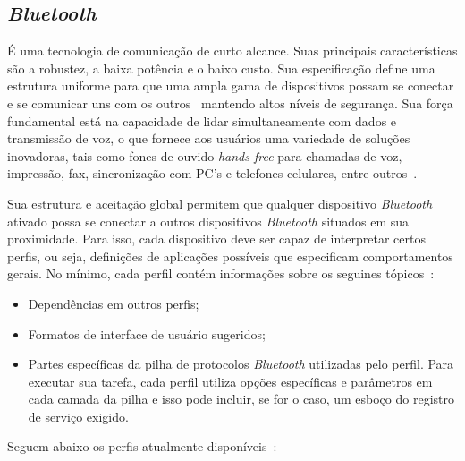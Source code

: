 \subsection{\emph{Bluetooth}}
\label{subsec:bluetooth}

É uma tecnologia de comunicação de curto alcance. Suas principais características são a robustez, a baixa potência e o baixo custo. Sua especificação define uma estrutura uniforme para que uma ampla gama de dispositivos possam se conectar e se comunicar uns com os outros~\cite{bluetoothoverview} mantendo altos níveis de segurança. Sua força fundamental está na capacidade de lidar simultaneamente com dados e transmissão de voz, o que fornece aos usuários uma variedade de soluções inovadoras, tais como fones de ouvido \emph{hands-free} para chamadas de voz, impressão, fax, sincronização com PC's e telefones celulares, entre outros~\cite{bluetoothoverview}.

Sua estrutura e aceitação global permitem que qualquer dispositivo \emph{Bluetooth} ativado possa se conectar a outros dispositivos \emph{Bluetooth} situados em sua proximidade. Para isso, cada dispositivo deve ser capaz de interpretar certos perfis, ou seja, definições de aplicações possíveis que especificam comportamentos gerais. No mínimo, cada perfil contém informações sobre os seguines tópicos~\cite{bluetoothprofiles}:

\begin{itemize}
	\item Dependências em outros perfis;
	\item Formatos de interface de usuário sugeridos;
	\item Partes específicas da pilha de protocolos \emph{Bluetooth} utilizadas pelo perfil. Para executar sua tarefa, cada perfil utiliza opções específicas e parâmetros em cada camada da pilha e isso pode incluir, se for o caso, um esboço do registro de serviço exigido.
\end{itemize}

Seguem abaixo os perfis atualmente disponíveis~\cite{bluetoothprofiles}:


